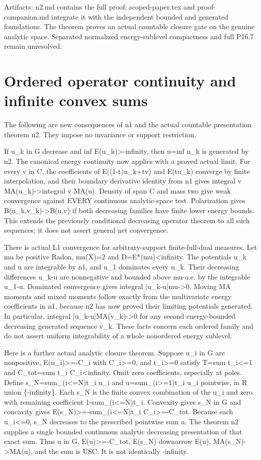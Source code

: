 \documentclass[11pt]{article}
\begin{document}
Artifacts: n2.md contains the full proof; scoped-paper.tex and proof-companion.md integrate it with the independent bounded and generated foundations. The theorem proves an actual countable closure gate on the genuine analytic space. Separated normalized energy-sublevel compactness and full P16.7 remain unresolved.

\section*{Ordered operator continuity and infinite convex sums}

The following are new consequences of n1 and the actual countable presentation theorem n2. They impose no invariance or support restriction.

If u\_k in G decrease and inf E(u\_k)>-infinity, then u=inf u\_k is generated by n2. The canonical energy continuity now applies with a proved actual limit. For every v in C, the coefficients of E((1-t)u\_k+tv) and E(tu\_k) converge by finite interpolation, and their boundary derivative identity from n1 gives integral v MA(u\_k)->integral v MA(u). Density of span C and mass two give weak convergence against EVERY continuous analytic-space test. Polarization gives B(u\_k,v\_k)->B(u,v) if both decreasing families have finite lower energy bounds. This extends the previously conditional decreasing operator theorem to all such sequences; it does not assert general net convergence.

There is actual L1 convergence for arbitrary-support finite-full-dual measures. Let mu be positive Radon, mu(X)=2 and D=E*(mu)<infinity. The potentials u\_k and u are integrable by n1, and u\_1 dominates every u\_k. Their decreasing differences u\_k-u are nonnegative and bounded above mu-a.e. by the integrable u\_1-u. Dominated convergence gives integral |u\_k-u|mu->0. Moving MA moments and mixed moments follow exactly from the multivariate energy coefficients in n1, because n2 has now proved their limiting potentials generated. In particular, integral |u\_k-u|MA(v\_k)->0 for any second energy-bounded decreasing generated sequence v\_k. These facts concern each ordered family and do not assert uniform integrability of a whole nonordered energy sublevel.

Here is a further actual analytic closure theorem. Suppose u\_i in G are nonpositive, E(u\_i)>=-C\_i with C\_i>=0, and t\_i>=0 satisfy T=sum t\_i<=1 and C\_tot=sum t\_i C\_i<infinity. Omit zero coefficients, especially at poles. Define s\_N=sum\_(i<=N)t\_i u\_i and u=sum\_(i>=1)t\_i u\_i pointwise, in R union \{-infinity\}. Each s\_N is the finite convex combination of the u\_i and zero with remaining coefficient 1-sum\_(i<=N)t\_i. Convexity gives s\_N in G and concavity gives E(s\_N)>=-sum\_(i<=N)t\_i C\_i>=-C\_tot. Because each u\_i<=0, s\_N decreases to the prescribed pointwise sum u. The theorem n2 supplies a single bounded continuous analytic decreasing presentation of that exact sum. Thus u in G, E(u)>=-C\_tot, E(s\_N) downarrow E(u), MA(s\_N)->MA(u), and the sum is USC. It is not identically -infinity.
\end{document}
